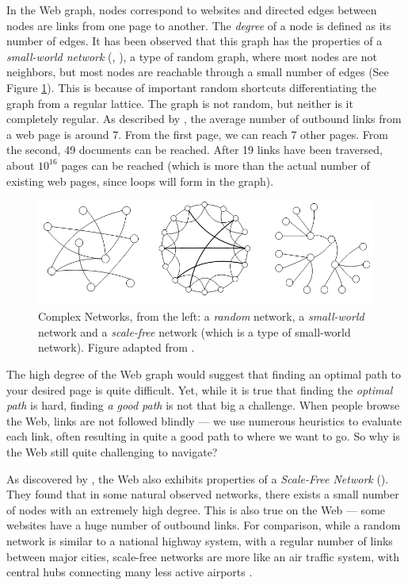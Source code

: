In the Web graph, nodes correspond to websites and
directed edges between nodes are links from one page to another. The \emph{degree} of a node is defined as its number of edges.
It has been observed that this graph has the properties of a \emph{small-world network} (\citep{Newman2000}, \citep[p.2]{Huang2005}), 
a type of random graph, where most nodes are not neighbors, but most nodes are reachable through a small number of edges (See Figure \ref{fig:swn}). 
This is because of important random shortcuts differentiating the graph from a regular lattice. 
The graph is not  random, but neither is it completely regular.
As described by \citet[p.37]{Barabasi2003}, the average number of outbound links from a web page is around 7.
From the first page, we can reach 7 other pages. From the second, 49 documents can be reached. 
After 19 links have been traversed, about $10^{16}$ pages can be reached (which is more than the actual number of existing web pages, since loops will form in the graph).

\begin{figure}[t]
  \includegraphics[width=\textwidth]{../graphics/graphs}
  \caption[Examples of Complex Networks]{
    Complex Networks,
    from the left: a \emph{random} network, a \emph{small-world} network and a \emph{scale-free} network 
    (which is a type of  small-world network). Figure adapted from \citet[p.2]{Huang2005}.} 
  \label{fig:swn}
\end{figure}

The high degree of the Web graph would suggest that finding an optimal path to your desired page is quite difficult. 
Yet, while it is true that finding the \emph{optimal path} is hard, finding \emph{a good path} is not that big a challenge. 
When people browse the Web, links are not followed blindly --- 
we use numerous heuristics to evaluate each link, often resulting in quite a good path to where we want to go. 
So why is the Web still quite challenging to navigate?

As discovered by \cite{Albert1999}, the Web also exhibits properties of a \emph{Scale-Free Network} (). 
They found that in some natural observed networks, there exists a small number of nodes with an extremely high degree. 
This is also true on the Web --- some websites have a huge number of outbound links. 
For comparison, while a random network is similar to a national highway system, with a regular number of links between major cities, scale-free networks are more like an air traffic system, with central hubs connecting many less active airports \citep[p.71]{Barabasi2003}.

